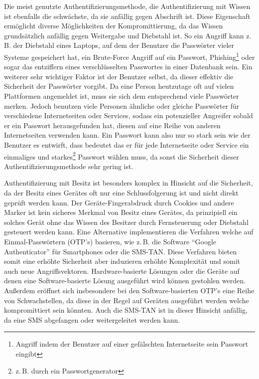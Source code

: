 \documentclass[11pt,a4paper,ngerman]{scrreprt}
\begin{document}
\begin{description}[font=\rmfamily]
    \item[Wissen:] Die meist genutzte Authentifizierungsmethode, die Authentifizierung mit Wissen ist ebenfalls die schwächste, da sie anfällig gegen Abschrift ist. Diese Eigenschaft ermöglicht diverse Möglichkeiten der Kompromittierung, da das Wissen grundsätzlich anfällig gegen Weitergabe und Diebstahl ist. So ein Angriff kann z.\,B. der Diebstahl eines Laptops, auf dem der Benutzer die Passwörter vieler Systeme gespeichert hat, ein Brute-Force Angriff auf ein Passwort, Phishing\footnote{Angriff indem der Benutzer auf einer gefälschten Internetseite sein Passwort eingibt} oder sogar das entziffern eines verschlüsselten Passwortes in einer Datenbank sein. Ein weiterer sehr wichtiger Faktor ist der Benutzer selbst, da dieser effektiv die Sicherheit der Passwörter vorgibt. Da eine Person heutzutage oft auf vielen Plattformen angemeldet ist, muss sie sich dem entsprechend viele Passwörter merken. Jedoch benutzen viele Personen ähnliche oder gleiche Passwörter für verschiedene Internetseiten oder Services, sodass ein potenzieller Angreifer sobald er ein Passwort herausgefunden hat, diesen auf eine Reihe von anderen Internetseiten verwenden kann. Ein Passwort kann also nur so stark sein wie der Benutzer es entwirft, dass bedeutet das er für jede Internetseite oder Service ein einmaliges und starkes\footnote{z.\,B. durch ein Passwortgenerator} Passwort wählen muss, da sonst die Sicherheit dieser Authentifizierungsmethode sehr gering ist.
    \item[Besitz:] Authentifizierung mit Besitz ist besonders komplex in Hinsicht auf die Sicherheit, da der Besitz eines Gerätes oft nur eine Schlussfolgerung ist und nicht direkt geprüft werden kann. Der Geräte-Fingerabdruck durch Cookies und andere Marker ist kein sicheres Merkmal von Besitz eines Gerätes, da prinzipiell ein solches Gerät ohne das Wissen des Besitzer durch Fernsteuerung oder Diebstahl gesteuert werden kann. Eine Alternative implementieren die Verfahren welche auf Einmal-Passwörtern (OTP's) basieren, wie z.\,B. die Software ``Google Authenticator'' für Smartphones oder die SMS-TAN. Diese Verfahren bieten somit eine erhöhte Sicherheit aber induzieren erhöhte Komplexität und somit auch neue Angriffsvektoren. Hardware-basierte Lösungen oder die Geräte auf denen eine Software-basierte Lösung ausgeführt wird können gestohlen werden. Außerdem eröffnet sich insbesondere bei den Software-basierten OTP's eine Reihe von Schwachstellen, da diese in der Regel auf Geräten ausgeführt werden welche kompromittiert sein könnten. Auch die SMS-TAN ist in dieser Hinsicht anfällig, da eine SMS abgefangen oder weitergeleitet werden kann.

\end{description}
\end{document}
